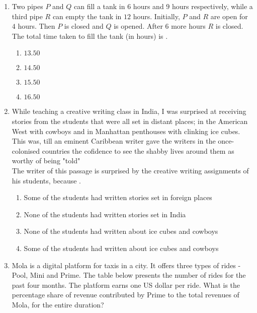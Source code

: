 \documentclass[journal,12pt,onecolumn]{IEEEtran}
\theoremstyle{remark}
\begin{document}
\begin{enumerate}
	\item Two pipes $P$ and $Q$ can fill a tank in $6$ hours and $9$ hours respectively, while a third pipe $R$ can empty the tank in $12$ hours. Initially, $P$ and $R$ are open for $4$ hours. Then $P$ is closed and $Q$ is opened. After $6$ more hours $R$ is closed. The total time taken to fill the tank (in hours) is \underline{\hspace{2cm}}.
		\begin{enumerate}                           
                        \item $13.50$                  
                        \item $14.50$                 
                        \item $15.50$
                        \item $16.50$
		\end{enumerate}
	\item While teaching a creative writing class in India, I was surprised at receiving stories from the students that were all set in distant places; in the American West with cowboys and in Manhattan penthouses with clinking ice cubes. This was, till an eminent Caribbean writer gave the writers in the once-colonised countries the cofidence to see the shabby lives around them as worthy of being "told"\\ The writer of this passage is surprised by the creative writing assignments of his students, because \underline{\hspace{2cm}}.
		\begin{enumerate}
			\item Some of the students had written stories set in foreign places
			\item None of the students had written stories set in India
			\item None of the students had written about ice cubes and cowboys
			\item Some of the students had written about ice cubes and cowboys
		\end{enumerate}
	\item Mola is a digital platform for taxis in a city. It offers three types of rides - Pool, Mini and Prime. The table below presents the number of rides for the past four months. The platform earns one US dollar per ride. What is the percentage share of revenue contributed by Prime to the total revenues of Mola, for the entire duration?
\begin{table}[h!]
\centering

\end{table}

\end{enumerate}
\end{document}
